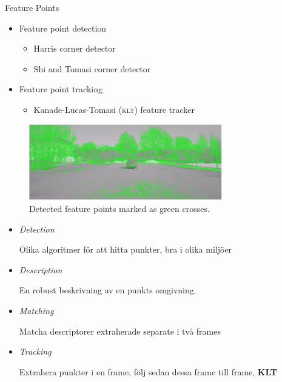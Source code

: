 \documentclass{beamer}
\newcommand{\klt}{\textsc{klt}\xspace}
\renewcommand{\a}{\r{a}\xspace}
\renewcommand{\o}{\"o\xspace}
\begin{document}
\begin{frame}{Feature Points}
	\begin{itemize}
		\item Feature point detection
		\begin{itemize}
			\item Harris corner detector
			\item Shi and Tomasi corner detector
		\end{itemize}
		\item Feature point tracking
		\begin{itemize}
			\item Kanade-Lucas-Tomasi (\klt) feature tracker
		\end{itemize}
	\end{itemize}
	\vspace{-1em}
	\begin{figure}
		\centering
		\includegraphics[width=0.75\textwidth]{harris_features}
		\caption{\label{fig:featurepointexample} Detected feature points marked as green crosses.}
	\end{figure}

	\note
	{
		\begin{itemize}
			\item \textit{Detection}

			Olika algoritmer f\o{}r att hitta punkter, bra i olika milj\o{}er

			\item \textit{Description}

			En robust beskrivning av en punkts omgivning.

			\item \textit{Matching}

			Matcha descriptorer extraherade separate i tv\a frames

			\item \textit{Tracking}

			Extrahera punkter i en frame, f\o{}lj sedan dessa frame till frame, \textbf{KLT}
		\end{itemize}
	}
\end{frame}
\end{document}
